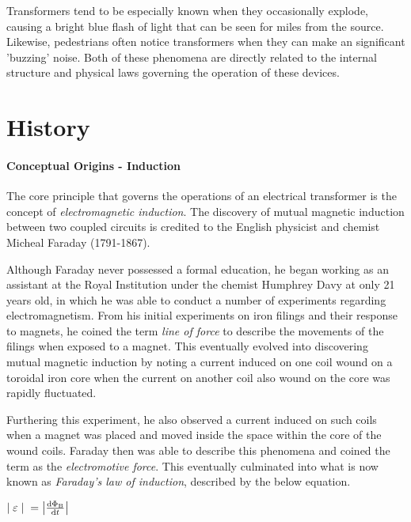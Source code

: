 \documentclass[12pt]{article}
\begin{document}
Transformers tend to be especially known when they occasionally explode, causing a bright blue flash of light that can be seen for miles from the source. Likewise, pedestrians often notice transformers when they can make an significant 'buzzing' noise. Both of these phenomena are directly related to the internal structure and physical laws governing the operation of these devices.

\section{History}

\paragraph{Conceptual Origins - Induction} 
The core principle that governs the operations of an electrical transformer is the concept of \textit{electromagnetic induction}. The discovery of mutual magnetic induction between two coupled circuits is credited to the English physicist and chemist Micheal Faraday (1791-1867).

Although Faraday never possessed a formal education, he began working as an assistant at the Royal Institution under the chemist Humphrey Davy at only 21 years old, in which he was able to conduct a number of experiments regarding electromagnetism. From his initial experiments on iron filings and their response to magnets, he coined the term \textit{line of force} to describe the movements of the filings when exposed to a magnet. This eventually evolved into discovering mutual magnetic induction by noting a current induced on one coil wound on a toroidal iron core when the current on another coil also wound on the core was rapidly fluctuated. 

Furthering this experiment, he also observed a current induced on such coils when a magnet was placed and moved inside the space within the core of the wound coils. Faraday then was able to describe this phenomena and coined the term as the \textit{electromotive force}. This eventually culminated into what is now known as \textit{Faraday's law of induction}, described by the below equation. 

\begin{center}
\begin{huge}
	
	\vspace{5mm}
	$\mid{\varepsilon}\mid \hspace{2mm }= \left|{{\mathrm{d}\Phi_\text{B}} \over \mathrm{d}t}\right|$
 	\vspace{5mm}	
\end{huge}
\end{center}
\end{document}
